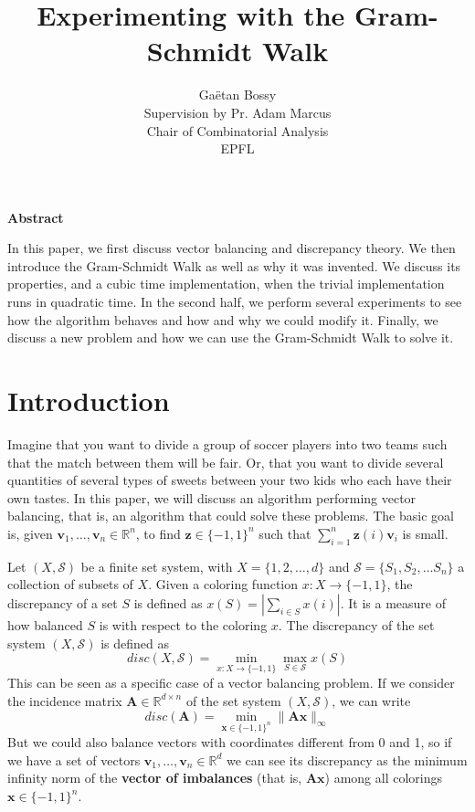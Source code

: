 \documentclass[12pt]{article}
\title{Experimenting with the Gram-Schmidt Walk}
\author{Gaëtan Bossy\\
Supervision by Pr. Adam Marcus\\
Chair of Combinatorial Analysis\\
EPFL}
\begin{document}
\maketitle
\begin{center}\bf Abstract\end{center}
\small In this paper, we first discuss vector balancing and discrepancy theory. We then introduce the Gram-Schmidt Walk as well as why it was invented. We discuss its properties, and a cubic time implementation, when the trivial implementation runs in quadratic time. In the second half, we perform several experiments to see how the algorithm behaves and how and why we could modify it. Finally, we discuss a new problem and how we can use the Gram-Schmidt Walk to solve it.

\section{Introduction}
Imagine that you want to divide a group of soccer players into two teams such that the match between them will be fair. Or, that you want to divide several quantities of several types of sweets between your two kids who each have their own tastes. In this paper, we will discuss an algorithm performing vector balancing, that is, an algorithm that could solve these problems. The basic goal is, given $\textbf{v}_1,\dots,\textbf{v}_n\in\mathbb{R}^n$, to find $\textbf{z}\in\{-1,1\}^n$ such that $\sum_{i=1}^n\textbf{z}(i)\textbf{v}_i$ is small. 

Let $(X, \mathcal{S})$ be a finite set system, with $X = \{1, 2, \dots, d\}$ and $\mathcal{S}= \{S_1, S_2, \dots S_n\}$ a collection of subsets of $X$. Given a coloring function $x : X \rightarrow \{-1, 1\}$, the discrepancy of a set $S$ is defined as $x(S)= |\sum_{i \in S}x(i)|$. It is a measure of how balanced $S$ is with respect to the coloring $x$. The discrepancy of the set system $(X,\mathcal{S})$ is defined as 
$$disc(X,\mathcal{S}) = \min_{x: X\rightarrow \{-1, 1\}} \max_{S \in \mathcal{S}} x(S)$$
This can be seen as a specific case of a vector balancing problem. If we consider the incidence matrix $\textbf{A} \in \mathbb{R}^{d \times n}$ of the set system $(X, \mathcal{S})$, we can write 
$$ disc(\textbf{A})= \min_{\textbf{x} \in \{-1, 1\}^n} \|\textbf{A}\textbf{x}\|_\infty$$
But we could also balance vectors with coordinates different from 0 and 1, so if we have a set of vectors $\textbf{v}_1,\dots,\textbf{v}_n\in\mathbb{R}^d$ we can see its discrepancy as the minimum infinity norm of the \textbf{vector of imbalances} (that is, $\textbf{Ax}$) among all colorings $\textbf{x}\in\{-1,1\}^n$.
\end{document}
